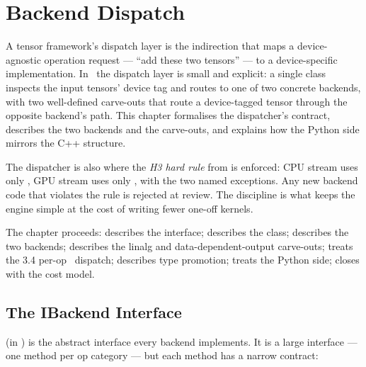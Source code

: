 \chapter{Backend Dispatch}
\label{ch:backend_dispatch}

A tensor framework's dispatch layer is the indirection that maps a
device-agnostic operation request --- ``add these two tensors'' ---
to a device-specific implementation. In \Lucid\ the dispatch
layer is small and explicit: a single  class
inspects the input tensors' device tag and routes to one of two
concrete backends, with two well-defined carve-outs that route a
device-tagged tensor through the opposite backend's path. This
chapter formalises the dispatcher's contract, describes the two
backends and the carve-outs, and explains how the Python side
mirrors the C++ structure.

The dispatcher is also where the \emph{H3 hard rule} from
 is enforced: CPU stream uses only \Accelerate,
GPU stream uses only \MLX, with the two named exceptions. Any new
backend code that violates the rule is rejected at review. The
discipline is what keeps the engine simple at the cost of writing
fewer one-off kernels.

The chapter proceeds: 
describes the  interface;
 describes the
 class; 
describes the two backends; 
describes the linalg and data-dependent-output carve-outs;
 treats the 3.4 per-op
\MPSGraph\ dispatch; 
describes type promotion; 
treats the Python side;  closes
with the cost model.

\section{The IBackend Interface}
\label{sec:backend_dispatch:ibackend}

 (in ) is the
abstract interface every backend implements. It is a large
interface --- one method per op category --- but each method has a
narrow contract:

